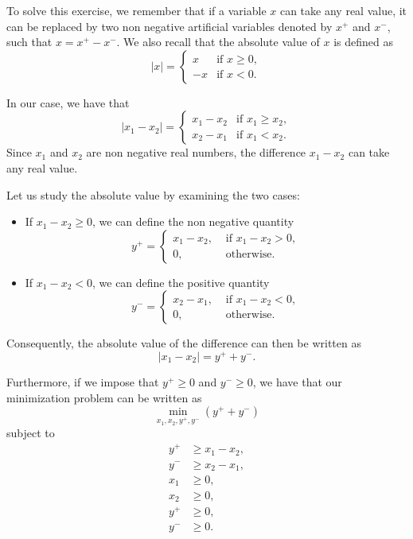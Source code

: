 
 To solve this exercise, we remember that if a variable $x$ can take any real value, it can be replaced by two non negative artificial variables denoted by $x^+$ and $x^-$, such that $x = x^+-x^-$. We also recall that the absolute value of $x$ is defined as
$$ |x| = \left\{ 
\begin{array}{rl}
 x & \mbox{if } x \geq 0, \\ 
 -x & \mbox{if } x < 0.
\end{array}
\right.$$

In our case, we have that
$$ |x_1 - x_2| = \left\{ 
\begin{array}{rl}
 x_1 - x_2 & \mbox{if } x_1 \geq x_2, \\ 
x_2 - x_1 & \mbox{if } x_1 <x_2.
\end{array}
\right.$$
Since $x_1$ and $x_2$ are non negative real numbers, the difference $x_1 - x_2$ can take any real value.

Let us study the absolute value by examining the two cases:
\begin{itemize}
\item If $x_1 - x_2 \geq 0$, we can define the non negative quantity
\[
y^+ = \left\{
\begin{aligned}
  x_1 - x_2, & \text{ if } x_1-x_2 > 0, \\
  0,     & \text{ otherwise}.
\end{aligned}
\right.
\]

\item If $x_1 - x_2 < 0$, we can define the positive quantity
\[
y^- = \left\{
\begin{aligned}
  x_2 - x_1, & \text{ if } x_1-x_2 < 0, \\
  0,     & \text{ otherwise}.
\end{aligned}
\right.
\]
\end{itemize}

Consequently, the absolute value of the difference can then be written as
$$ | x_1 - x_2 | = y^+ + y^-. $$

Furthermore, if we impose that $y^+ \geq 0$ and $y^- \geq 0$, we have that our minimization problem can be written as
$$\min_{x_1,x_2,y^+,y^-} (y^+ + y^-) $$
subject to
\begin{align*}
y^+ & \geq x_1-x_2,\\
y^- & \geq x_2-x_1, \\
x_1 & \geq 0,\\
x_2 & \geq 0,\\
y^+ & \geq 0,\\
y^- & \geq 0.
\end{align*}

